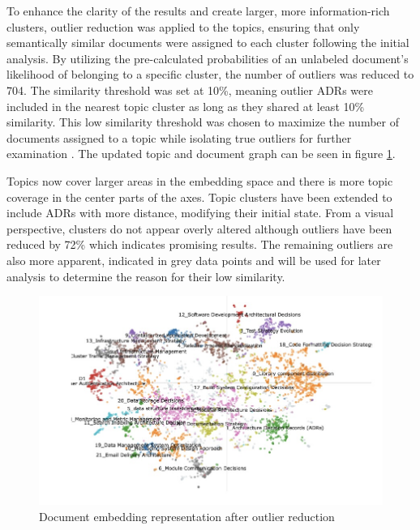         To enhance the clarity of the results and create larger, more information-rich clusters, outlier reduction was applied to the topics, ensuring that only semantically similar documents were assigned to each cluster following the initial analysis. By utilizing the pre-calculated probabilities of an unlabeled document's likelihood of belonging to a specific cluster, the number of outliers was reduced to 704. The similarity threshold was set at 10\%, meaning outlier ADRs were included in the nearest topic cluster as long as they shared at least 10\% similarity. This low similarity threshold was chosen to maximize the number of documents assigned to a topic while isolating true outliers for further examination . The updated topic and document graph can be seen in figure \ref{fig:docs_reduced}.
        
        Topics now cover larger areas in the embedding space and there is more topic coverage in the center parts of the axes. Topic clusters have been extended to include ADRs with more distance, modifying their initial state. From a visual perspective, clusters do not appear overly altered although outliers have been reduced by 72\% which indicates promising results. The remaining outliers are also more apparent, indicated in grey data points and will be used for later analysis to determine the reason for their low similarity.

        \begin{figure}[h!]
            \centering
            \hspace*{-2.2cm} 
            \includegraphics[scale=0.65]{figures/BerTopic_Reduced/docs_reduced_outliers.jpeg}
            \caption{Document embedding representation after outlier reduction}
            \label{fig:docs_reduced}
        \end{figure}

